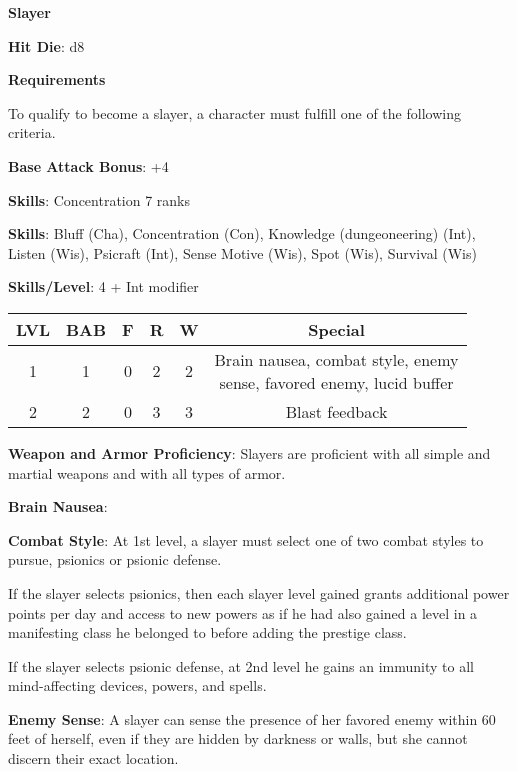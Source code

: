 \textbf{\huge{Slayer}}

\textbf{Hit Die}: d8

\textbf{\large{Requirements}}

To qualify to become a slayer, a character must fulfill one of the following criteria.

\textbf{Base Attack Bonus}: +4

\textbf{Skills}: Concentration 7 ranks

\textbf{Skills}: Bluff (Cha), Concentration (Con), Knowledge (dungeoneering) (Int), Listen (Wis), Psicraft (Int), Sense Motive (Wis), Spot (Wis), Survival (Wis)

\textbf{Skills/Level}: 4 + Int modifier

\begin{center}
\begin{adjustwidth}{-4cm}{}
\begin{small}
\begin{tabular}{| c | c | c | c | c | c |}
\hline
LVL &BAB &F &R &W &Special \\
\hline
1 &1 &0 &2 &2 &\makecell{Brain nausea, combat style, enemy\\ sense, favored enemy, lucid buffer} \\
2 &2 &0 &3 &3 &Blast feedback \\
\hline
\end{tabular}
\end{small}
\end{adjustwidth}
\end{center}

\textbf{Weapon and Armor Proficiency}: Slayers are proficient with all simple and martial weapons and with all types of armor.

\textbf{Brain Nausea}:

\textbf{Combat Style}: At 1st level, a slayer must select one of two combat styles to pursue, psionics or psionic defense. 

If the slayer selects psionics, then each slayer level gained grants additional power points per day and access to new powers as if he had also gained a level in a manifesting class he belonged to before adding the prestige class.

If the slayer selects psionic defense, at 2nd level he gains an immunity to all mind-affecting devices, powers, and spells. 

\textbf{Enemy Sense}: A slayer can sense the presence of her favored enemy within 60 feet of herself, even if they are hidden by darkness or walls, but she cannot discern their exact location.

